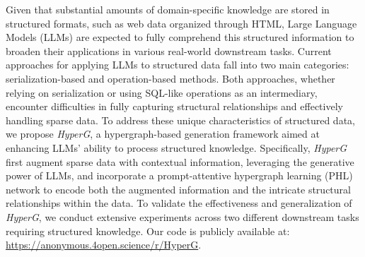Given that substantial amounts of domain-specific knowledge are stored in structured formats, such as web data organized through HTML, Large Language Models (LLMs) are expected to fully comprehend this structured information to broaden their applications in various real-world downstream tasks. Current approaches for applying LLMs to structured data fall into two main categories: serialization-based and operation-based methods. Both approaches, whether relying on serialization or using SQL-like operations as an intermediary, encounter difficulties in fully capturing structural relationships and effectively handling sparse data. To address these unique characteristics of structured data, we propose \textit{HyperG}, a hypergraph-based generation framework aimed at enhancing LLMs' ability to process structured knowledge. Specifically, \textit{HyperG} first augment sparse data with contextual information, leveraging the generative power of LLMs, and incorporate a prompt-attentive hypergraph learning (PHL) network to encode both the augmented information and the intricate structural relationships within the data. To validate the effectiveness and generalization of \textit{HyperG}, we conduct extensive experiments across two different downstream tasks requiring structured knowledge. Our code is publicly available at: \url{https://anonymous.4open.science/r/HyperG}.